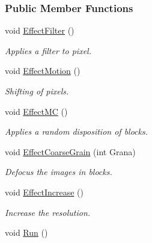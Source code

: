 \subsubsection*{\-Public \-Member \-Functions}
\begin{DoxyCompactItemize}
\item 
\hypertarget{classDrEffect_a62e60652a984dcd65b592fde6e89ddbc}{void \hyperlink{classDrEffect_a62e60652a984dcd65b592fde6e89ddbc}{\-Effect\-Filter} ()}\label{classDrEffect_a62e60652a984dcd65b592fde6e89ddbc}

\begin{DoxyCompactList}\small\item\em \-Applies a filter to pixel. \end{DoxyCompactList}\item 
\hypertarget{classDrEffect_a3106c4097c47a929b15fb0bf788b161d}{void \hyperlink{classDrEffect_a3106c4097c47a929b15fb0bf788b161d}{\-Effect\-Motion} ()}\label{classDrEffect_a3106c4097c47a929b15fb0bf788b161d}

\begin{DoxyCompactList}\small\item\em \-Shifting of pixels. \end{DoxyCompactList}\item 
\hypertarget{classDrEffect_ae52c5b89d732c8cd4c027c2e6d82be39}{void \hyperlink{classDrEffect_ae52c5b89d732c8cd4c027c2e6d82be39}{\-Effect\-M\-C} ()}\label{classDrEffect_ae52c5b89d732c8cd4c027c2e6d82be39}

\begin{DoxyCompactList}\small\item\em \-Applies a random disposition of blocks. \end{DoxyCompactList}\item 
\hypertarget{classDrEffect_aab090cce7962df824dd04060dc002bc2}{void \hyperlink{classDrEffect_aab090cce7962df824dd04060dc002bc2}{\-Effect\-Coarse\-Grain} (int \-Grana)}\label{classDrEffect_aab090cce7962df824dd04060dc002bc2}

\begin{DoxyCompactList}\small\item\em \-Defocus the images in blocks. \end{DoxyCompactList}\item 
\hypertarget{classDrEffect_aadc5a450e9bf79186f43915f10886c0d}{void \hyperlink{classDrEffect_aadc5a450e9bf79186f43915f10886c0d}{\-Effect\-Increase} ()}\label{classDrEffect_aadc5a450e9bf79186f43915f10886c0d}

\begin{DoxyCompactList}\small\item\em \-Increase the resolution. \end{DoxyCompactList}\item 
\hypertarget{classDrEffect_aa3eca255b6be227d7d901cc2a72017a5}{void \hyperlink{classDrEffect_aa3eca255b6be227d7d901cc2a72017a5}{\-Run} ()}\label{classDrEffect_aa3eca255b6be227d7d901cc2a72017a5}


\end{DoxyCompactItemize}
